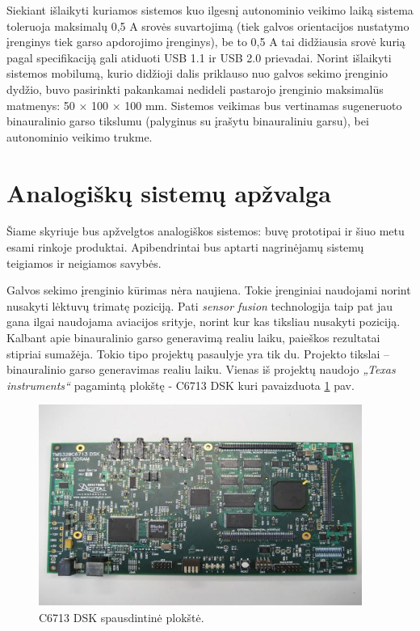 \documentclass[]{vgtuef}
\begin{document}
Siekiant išlaikyti kuriamos sistemos kuo ilgesnį autonominio veikimo laiką sistema toleruoja maksimalų 0,5 A srovės suvartojimą (tiek galvos orientacijos nustatymo įrenginys tiek garso apdorojimo įrenginys), be to 0,5 A tai didžiausia srovė kurią pagal specifikaciją gali atiduoti USB 1.1 ir USB 2.0 prievadai.
Norint išlaikyti sistemos mobilumą, kurio didžioji dalis priklauso nuo galvos sekimo įrenginio dydžio, buvo pasirinkti pakankamai nedideli pastarojo įrenginio maksimalūs matmenys: 50 × 100 × 100 mm.  
Sistemos veikimas bus vertinamas sugeneruoto binauralinio garso tikslumu (palyginus su įrašytu binauraliniu garsu), bei autonominio veikimo trukme.


\section{Analogiškų sistemų apžvalga}

Šiame skyriuje bus apžvelgtos analogiškos sistemos: buvę prototipai ir šiuo metu esami rinkoje produktai. Apibendrintai bus aptarti nagrinėjamų sistemų teigiamos ir neigiamos savybės. 


Galvos sekimo įrenginio kūrimas nėra naujiena. Tokie įrenginiai naudojami norint nusakyti lėktuvų  trimatę poziciją. Pati \textit{sensor fusion} technologija taip pat jau gana ilgai naudojama aviacijos srityje, norint kur kas tiksliau nusakyti poziciją.
Kalbant apie binauralinio garso generavimą realiu laiku, paieškos rezultatai stipriai sumažėja. Tokio tipo projektų pasaulyje yra tik du. Projekto tikslai – binauralinio garso generavimas realiu laiku. Vienas iš projektų naudojo \textit{„Texas instruments“} pagamintą plokštę - C6713 DSK kuri pavaizduota \ref{fig:C6713_dsk_board} pav.

\begin{figure}[!ht]
  \centering
  \includegraphics[width=400px]{img/c6713.jpg}
  \caption{C6713 DSK spausdintinė plokštė.}
  \label{fig:C6713_dsk_board}
\end{figure}
\end{document}
